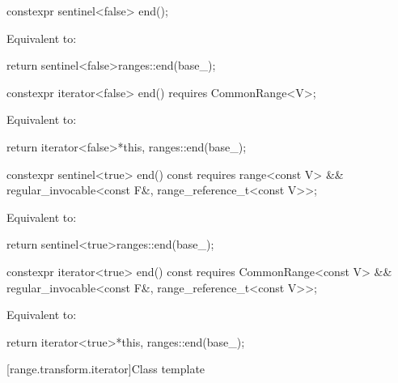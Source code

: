 %
\begin{itemdecl}
constexpr sentinel<false> end();
\end{itemdecl}

\begin{itemdescr}
\pnum
\effects Equivalent to:
\begin{codeblock}
return sentinel<false>{ranges::end(base_)};
\end{codeblock}
\end{itemdescr}

%
\begin{itemdecl}
constexpr iterator<false> end() requires CommonRange<V>;
\end{itemdecl}

\begin{itemdescr}
\pnum
\effects Equivalent to:
\begin{codeblock}
return iterator<false>{*this, ranges::end(base_)};
\end{codeblock}
\end{itemdescr}

%
\begin{itemdecl}
constexpr sentinel<true> end() const
  requires range<const V> &&
           regular_invocable<const F&, range_reference_t<const V>>;
\end{itemdecl}

\begin{itemdescr}
\pnum
\effects Equivalent to:
\begin{codeblock}
return sentinel<true>{ranges::end(base_)};
\end{codeblock}
\end{itemdescr}

%
\begin{itemdecl}
constexpr iterator<true> end() const
  requires CommonRange<const V> &&
           regular_invocable<const F&, range_reference_t<const V>>;
\end{itemdecl}

\begin{itemdescr}
\pnum
\effects Equivalent to:
\begin{codeblock}
return iterator<true>{*this, ranges::end(base_)};
\end{codeblock}
\end{itemdescr}

[range.transform.iterator]{Class template }

